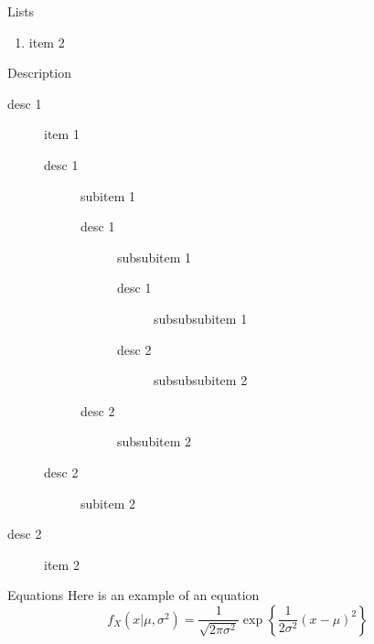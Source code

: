 \documentclass[a0paper,portrait]{baposter}
\begin{document}
\begin{poster}
\begin{posterbox}[name=lists,column=0,below=usage]{Lists}
\begin{enumerate}
\begin{enumerate}
      \item subitem 2
    \end{enumerate}
  \item item 2
\end{enumerate}
Description
\begin{description}
  \item[desc 1] item 1
    \begin{description}
      \item[desc 1] subitem 1
        \begin{description}
          \item[desc 1] subsubitem 1
            \begin{description}
              \item[desc 1] subsubsubitem 1
              \item[desc 2] subsubsubitem 2
            \end{description}
          \item[desc 2] subsubitem 2
        \end{description}
      \item[desc 2] subitem 2
    \end{description}
  \item[desc 2] item 2
\end{description}
\end{posterbox}

\begin{posterbox}[name=equation,column=0,below=lists,above=bottom]{Equations}
Here is an example of an equation
\begin{equation}
  f_X(x|\mu,\sigma^2) = \frac{1}{\sqrt{2\pi\sigma^2}}\exp\left\{\frac{1}{2\sigma^2}(x-\mu)^2\right\}
\end{equation}
\end{posterbox}


\end{poster}
\end{document}

